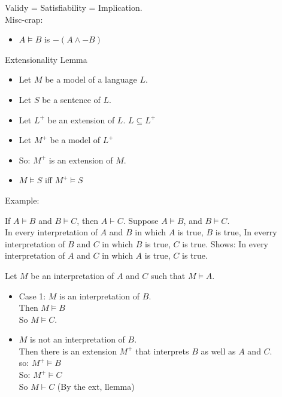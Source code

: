 Validy = Satisfiability = Implication.\\

Misc-crap:
\begin{itemize}
\item $A \vDash B$ is $-(A \wedge -B)$
\end{itemize}

\begin{lemma}
Extensionality Lemma\\
\begin{itemize}
\item Let $M$ be a model of a language $L$.
\item Let $S$ be a sentence of $L$.
\item Let $L^+$ be an extension of $L$. $L \subseteq L^+$
\item Let $M^+$ be a model of $L^+$
\item So: $M^+$ is an extension of $M$.
\item $M \vDash S$ iff $ M^+ \vDash S$
\end{itemize}
\end{lemma}
Example:

If $A \vDash B$ and $B \vDash C$, then $A \vdash C$.
Suppose $A \vDash B$, and $B \vDash C$.\\
In every interpretation of $A$ and $B$ in which $A$ is true, $B$ is true,
In everry interpretation of $B$ and $C$ in which $B$ is true, $C$ is true.
Shows: In every interpretation of $A$ and $C$ in which $A$ is true, $C$ is true.

Let $M$ be an interpretation of $A$ and $C$ such that $M \vDash A$.
\begin{itemize}
\item Case 1:
$M$ is an interpretation of $B$. \\
Then $M \vDash B$ \\
So $M \vDash C$. \\
\item $M$ is not an interpretation of $B$. \\
Then there is an extension $M^+$ that interprets $B$ as well as $A$ and $C$. \\
so: $M^+ \vDash B$ \\
So: $M^+ \vDash C$ \\
So $M \vdash C$ (By the ext, llemma) \\
\end{itemize}


